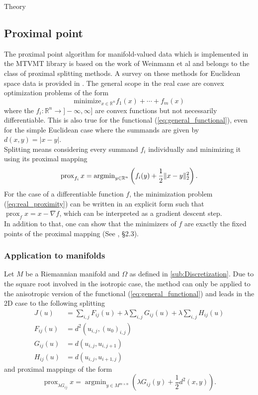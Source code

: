 \begin{chapter}{Theory}
\subsection{Proximal point} %
\label{sub:ProximalPoint}
The proximal point algorithm for manifold-valued data which is implemented in the MTVMT library is based on the work of Weinmann et al\cite{Weinmann} and belongs to the class
of proximal splitting methods. A survey on these methods for Euclidean space data is provided in \cite{CombettesPequet}. The general scope in the real case are convex
optimization problems of the form
\begin{equation}
    \text{minimize}_{x\in \mathbb{R}^n} f_1(x) + \cdots +f_m(x)
\end{equation}
where the $f_i:\mathbb{R}^n\to]-\infty,\infty]$ are convex functions but not necessarily differentiable. This is also true for the functional (\ref{eq:general_functional}),
even for the simple Euclidean case where the summands are given by $d(x,y)=|x-y|$. \\
Splitting means considering every summand $f_i$ individually and minimizing it using its proximal mapping
\begin{equation}
    \label{eq:real_proximity}
    \operatorname{prox}_{f_i}x=\operatorname{argmin}_{y\in\mathbb{R}^n}\left(f_i(y) + \frac{1}{2}\| x-y \|^2_{2} \right).
\end{equation}
For the case of a differentiable function $f$, the minimization problem (\ref{eq:real_proximity}) 
can be written in an explicit form such that $\operatorname{prox}_f x = x-\nabla f$, which 
can be interpreted as a gradient descent step.\\
In addition to that, one can show that the minimizers of $f$ are exactly the fixed points of the proximal mapping (See \cite{ParikhBoyd}, \S 2.3).

\subsubsection{Application to manifolds} %
\label{ssub:Application to manifolds}
Let $M$ be a Riemannian manifold and $\Omega$ as defined in \ref{sub:Discretization}. Due to the square root involved in the isotropic case,
the method can only be applied to the anisotropic version of the functional (\ref{eq:general_functional}) and leads in the 2D case to the following splitting
\begin{align}
    J(u)	&= \sum_{i,j}F_{ij}(u)+\lambda\sum_{i,j}G_{ij}(u)+\lambda\sum_{i,j}H_{ij}(u)\\
    F_{ij}(u)	&=  d^{2}(u_{i,j},(u_0)_{i,j})\\
    G_{ij}(u)	&=  d(u_{i,j},u_{i,j+1})\\
    H_{ij}(u)	&=  d(u_{i,j},u_{i+1,j})
\end{align}
and proximal mappings of the form
\begin{equation}
\label{eq:manifold_proximity}
\operatorname{prox}_{\lambda G_{ij}}x=\operatorname{argmin}_{y\in M^{m\times n}}\left(\lambda G_{ij}(y) +\frac{1}{2}d^2(x,y) \right).
\end{equation}


\end{chapter}
